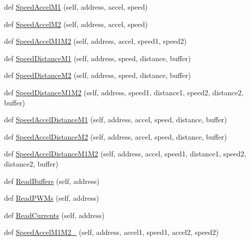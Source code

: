 \begin{DoxyCompactItemize}
\item 
def \mbox{\hyperlink{classtoxic__hardware_1_1roboclaw__3_1_1Roboclaw_aed66489886b7cfdaaeb2be6cda59427c}{Speed\+Accel\+M1}} (self, address, accel, speed)
\item 
def \mbox{\hyperlink{classtoxic__hardware_1_1roboclaw__3_1_1Roboclaw_ac9b5288bf09d899fb2891fa4a1cb5326}{Speed\+Accel\+M2}} (self, address, accel, speed)
\item 
def \mbox{\hyperlink{classtoxic__hardware_1_1roboclaw__3_1_1Roboclaw_a5e5e1072e698207b50ecf2f6adf5e367}{Speed\+Accel\+M1\+M2}} (self, address, accel, speed1, speed2)
\item 
def \mbox{\hyperlink{classtoxic__hardware_1_1roboclaw__3_1_1Roboclaw_a6664490ee5bec1b0c496b148c9b3f4c7}{Speed\+Distance\+M1}} (self, address, speed, distance, buffer)
\item 
def \mbox{\hyperlink{classtoxic__hardware_1_1roboclaw__3_1_1Roboclaw_a6469781a5630e53aa70f19cf603cfcc0}{Speed\+Distance\+M2}} (self, address, speed, distance, buffer)
\item 
def \mbox{\hyperlink{classtoxic__hardware_1_1roboclaw__3_1_1Roboclaw_ac0664ea79d863b5f153a7a3dac18222d}{Speed\+Distance\+M1\+M2}} (self, address, speed1, distance1, speed2, distance2, buffer)
\item 
def \mbox{\hyperlink{classtoxic__hardware_1_1roboclaw__3_1_1Roboclaw_a111c7779f07f5757ba9ba7e93b0edb39}{Speed\+Accel\+Distance\+M1}} (self, address, accel, speed, distance, buffer)
\item 
def \mbox{\hyperlink{classtoxic__hardware_1_1roboclaw__3_1_1Roboclaw_a445110f8fd4f9bbf61bcd9c4a5144ad7}{Speed\+Accel\+Distance\+M2}} (self, address, accel, speed, distance, buffer)
\item 
def \mbox{\hyperlink{classtoxic__hardware_1_1roboclaw__3_1_1Roboclaw_ac2b210f5288d22c653c019bd60ee7fda}{Speed\+Accel\+Distance\+M1\+M2}} (self, address, accel, speed1, distance1, speed2, distance2, buffer)
\item 
def \mbox{\hyperlink{classtoxic__hardware_1_1roboclaw__3_1_1Roboclaw_a0ccc774bd702e611c98c01313707b8fe}{Read\+Buffers}} (self, address)
\item 
def \mbox{\hyperlink{classtoxic__hardware_1_1roboclaw__3_1_1Roboclaw_ad6694602dd7294a517f29dfcbf0a3068}{Read\+P\+W\+Ms}} (self, address)
\item 
def \mbox{\hyperlink{classtoxic__hardware_1_1roboclaw__3_1_1Roboclaw_ac9359f88c9e1b9b23e09ba962bc2774e}{Read\+Currents}} (self, address)
\item 
def \mbox{\hyperlink{classtoxic__hardware_1_1roboclaw__3_1_1Roboclaw_ab9eb6d09f652e887dd9d6b8d1300d919}{Speed\+Accel\+M1\+M2\+\_}} (self, address, accel1, speed1, accel2, speed2)

\end{DoxyCompactItemize}
